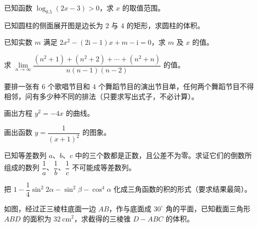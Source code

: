 \begin{question}
已知函数 $\log_{0.5}(2x-3)>0$，求 $x$ 的取值范围。

\end{question}
\begin{question}
已知圆柱的侧面展开图是边长为 $2$ 与 $4$ 的矩形，求圆柱的体积。

\end{question}
\begin{question}
已知实数 $m$ 满足 $2x^2-(2\mathrm i-1)x+m-\mathrm i=0$，求 $m$ 及 $x$ 的值。

\end{question}
\begin{question}
求 $\lim\limits_{n\to\infty}\dfrac{(n^2+1)+(n^2+2)+\cdots+(n^2+n)}{n(n-1)(n-2)}$ 的值。

\end{question}
\begin{question}
要排一张有 $6$ 个歌唱节目和 $4$ 个舞蹈节目的演出节目单，任何两个舞蹈节目不得相邻，问有多少种不同的排法（只要求写出式子，不必计算）。

\end{question}
\begin{question}
画出方程 $y^2=-4x$ 的曲线。

\end{question}
\begin{question}
画出函数 $y=\dfrac{1}{(x+1)^2}$ 的图象。

\end{question}
\begin{question}
已知等差数列 $a$、$b$、$c$ 中的三个数都是正数，且公差不为零。求证它们的倒数所组成的数列 $\dfrac1a$、$\dfrac1b$、$\dfrac1c$ 不可能成等差数列。

\end{question}
\begin{question}
把 $1-\dfrac14\sin^2 2\alpha-\sin^2\beta-\cos^4\alpha$ 化成三角函数的积的形式（要求结果最简）。

\Needspace{0.4\textheight}
\end{question}
\begin{question}
如图，经过正三棱柱底面一边 $AB$，作与底面成 $30^\circ$ 角的平面，已知截面三角形 $ABD$ 的面积为 $32\ \mathrm{cm}^2$，求截得的三棱锥 $D-ABC$ 的体积。
\nopagebreak[4]
\begin{center}\end{center}
\nopagebreak[4]
\end{question}
